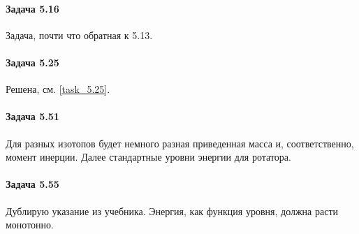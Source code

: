 \documentclass[12pt]{article}
\begin{document}
\paragraph{Задача 5.16} Задача, почти что обратная к 5.13.
\paragraph{Задача 5.25} Решена, см. \ref{task_5.25}.
\paragraph{Задача 5.51} Для разных изотопов будет немного разная приведенная масса и, соответственно, момент инерции. Далее стандартные уровни энергии для ротатора.
\paragraph{Задача 5.55} Дублирую указание из учебника. Энергия, как функция уровня, должна расти монотонно. 
\end{document}
